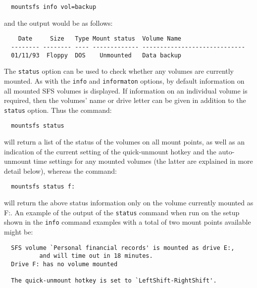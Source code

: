 {\tt \verb|  |mountsfs info vol=backup}

and the output would be as follows:

\begin{verbatim}
    Date     Size   Type Mount status  Volume Name
  -------- -------- ---- ------------- -----------------------------
  01/11/93  Floppy  DOS    Unmounted   Data backup
\end{verbatim}

The {\tt status} option can be used to check whether any volumes are currently
moun\-ted.  As with the {\tt info} and {\tt informaton} options, by default information
on all mounted SFS volumes is displayed.  If information on an individual
volume is required, then the volumes' name or drive letter can be given in
addition to the {\tt status} option.  Thus the command:

{\tt \verb|  |mountsfs status}

will return a list of the status of the volumes on all mount points, as well as
an indication of the current setting of the quick-unmount hotkey and the
auto-unmount time settings for any mounted volumes (the latter are explained in 
more detail below), whereas the command:

{\tt \verb|  |mountsfs status f:}

will return the above status information only on the volume currently mounted
as F:.  An example of the output of the {\tt status} command when run on the setup
shown in the {\tt info} command examples with a total of two mount points available
might be:

\begin{verbatim}
  SFS volume `Personal financial records' is mounted as drive E:,
          and will time out in 18 minutes.
  Drive F: has no volume mounted

  The quick-unmount hotkey is set to `LeftShift-RightShift'.
\end{verbatim}

